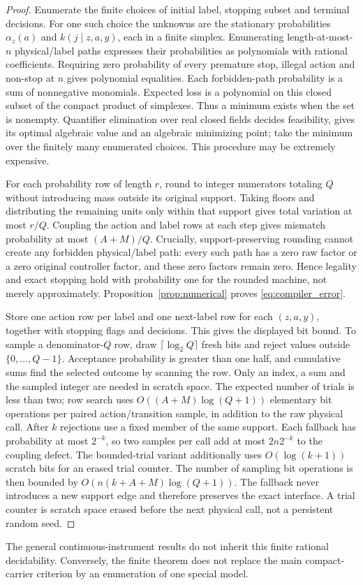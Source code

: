 \begin{proof}
Enumerate the finite choices of initial label, stopping subset and terminal decisions. For one such choice the unknowns are the stationary probabilities $\alpha_z(a)$ and $k(j\mid z,a,y)$, each in a finite simplex. Enumerating length-at-most-$n$ physical/label paths expresses their probabilities as polynomials with rational coefficients. Requiring zero probability of every premature stop, illegal action and non-stop at $n$ gives polynomial equalities. Each forbidden-path probability is a sum of nonnegative monomials. Expected loss is a polynomial on this closed subset of the compact product of simplexes. Thus a minimum exists when the set is nonempty. Quantifier elimination over real closed fields decides feasibility, gives its optimal algebraic value and an algebraic minimizing point; take the minimum over the finitely many enumerated choices\cite{bpr}. This procedure may be extremely expensive.

For each probability row of length $r$, round to integer numerators totaling $Q$ without introducing mass outside its original support. Taking floors and distributing the remaining units only within that support gives total variation at most $r/Q$. Coupling the action and label rows at each step gives mismatch probability at most $(A+M)/Q$. Crucially, support-preserving rounding cannot create any forbidden physical/label path: every such path has a zero raw factor or a zero original controller factor, and these zero factors remain zero. Hence legality and exact stopping hold with probability one for the rounded machine, not merely approximately. Proposition~\ref{prop:numerical} proves \eqref{eq:compiler_error}.

Store one action row per label and one next-label row for each $(z,a,y)$, together with stopping flags and decisions. This gives the displayed bit bound. To sample a denominator-$Q$ row, draw $\lceil\log_2Q\rceil$ fresh bits and reject values outside $\{0,\ldots,Q-1\}$. Acceptance probability is greater than one half, and cumulative sums find the selected outcome by scanning the row. Only an index, a sum and the sampled integer are needed in scratch space. The expected number of trials is less than two; row search uses $O((A+M)\log(Q+1))$ elementary bit operations per paired action/transition sample, in addition to the raw physical call. After $k$ rejections use a fixed member of the same support. Each fallback has probability at most $2^{-k}$, so two samples per call add at most $2n2^{-k}$ to the coupling defect. The bounded-trial variant additionally uses $O(\log(k+1))$ scratch bits for an erased trial counter. The number of sampling bit operations is then bounded by $O(n(k+A+M)\log(Q+1))$. The fallback never introduces a new support edge and therefore preserves the exact interface. A trial counter is scratch space erased before the next physical call, not a persistent random seed.
\end{proof}
The general continuous-instrument results do not inherit this finite rational decidability. Conversely, the finite theorem does not replace the main compact-carrier criterion by an enumeration of one special model.

